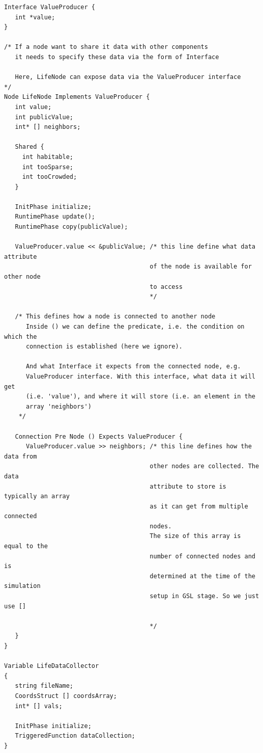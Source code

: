 {\tiny 
\begin{verbatim}
Interface ValueProducer {
   int *value;
}

/* If a node want to share it data with other components
   it needs to specify these data via the form of Interface
   
   Here, LifeNode can expose data via the ValueProducer interface
*/
Node LifeNode Implements ValueProducer {
   int value;
   int publicValue;
   int* [] neighbors;

   Shared {
     int habitable;
     int tooSparse;
     int tooCrowded;
   }

   InitPhase initialize;
   RuntimePhase update();
   RuntimePhase copy(publicValue);

   ValueProducer.value << &publicValue; /* this line define what data attribute
                                        of the node is available for other node
                                        to access 
                                        */

   /* This defines how a node is connected to another node 
      Inside () we can define the predicate, i.e. the condition on which the
      connection is established (here we ignore).
      
      And what Interface it expects from the connected node, e.g.
      ValueProducer interface. With this interface, what data it will get 
      (i.e. 'value'), and where it will store (i.e. an element in the
      array 'neighbors')
    */
   
   Connection Pre Node () Expects ValueProducer {
      ValueProducer.value >> neighbors; /* this line defines how the data from
                                        other nodes are collected. The data
                                        attribute to store is typically an array
                                        as it can get from multiple connected
                                        nodes.
                                        The size of this array is equal to the
                                        number of connected nodes and is
                                        determined at the time of the simulation
                                        setup in GSL stage. So we just use []
                                        
                                        */
   }
}

Variable LifeDataCollector
{
   string fileName;
   CoordsStruct [] coordsArray;
   int* [] vals;

   InitPhase initialize;
   TriggeredFunction dataCollection;
}
\end{verbatim}
}

